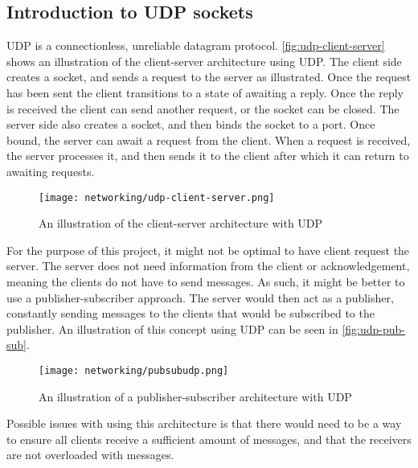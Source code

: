 \subsection{Introduction to UDP sockets}
UDP is a connectionless, unreliable datagram protocol.
\autoref{fig:udp-client-server} shows an illustration of the client-server architecture using UDP.
The client side creates a socket, and sends a request to the server as illustrated.
Once the request has been sent the client transitions to a state of awaiting a reply.
Once the reply is received the client can send another request, or the socket can be closed. 
The server side also creates a socket, and then binds the socket to a port.
Once bound, the server can await a request from the client.
When a request is received, the server processes it, and then sends it to the client after which it can return to awaiting requests.
\begin{figure}[H]
    \centering
    \texttt{[image: networking/udp-client-server.png]}
    \caption{An illustration of the client-server architecture with UDP}
    \label{fig:udp-client-server}
\end{figure}
\noindent
For the purpose of this project, it might not be optimal to have client request the server.
The server does not need information from the client or acknowledgement, meaning the clients do not have to send messages.
As such, it might be better to use a publisher-subscriber approach.
The server would then act as a publisher, constantly sending messages to the clients that would be subscribed to the publisher.
An illustration of this concept using UDP can be seen in \autoref{fig:udp-pub-sub}.
\begin{figure}[H]
    \centering
    \texttt{[image: networking/pubsubudp.png]}
    \caption{An illustration of a publisher-subscriber architecture with UDP}
    \label{fig:udp-pub-sub}
\end{figure}
\noindent
Possible issues with using this architecture is that there would need to be a way to ensure all clients receive a sufficient amount of messages, and that the receivers are not overloaded with messages.

